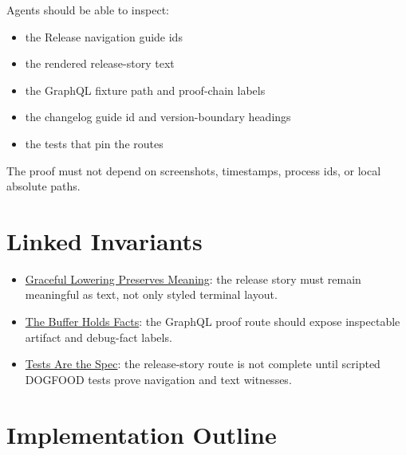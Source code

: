 Agents should be able to inspect:

\begin{itemize}
\tightlist
\item
  the Release navigation guide ids
\item
  the rendered release-story text
\item
  the GraphQL fixture path and proof-chain labels
\item
  the changelog guide id and version-boundary headings
\item
  the tests that pin the routes
\end{itemize}

The proof must not depend on screenshots, timestamps, process ids, or local absolute paths.

\section{Linked Invariants}\label{record-118-linked-invariants}

\begin{itemize}
\tightlist
\item
  \href{https://github.com/flyingrobots/bijou/blob/cbd70612140e7a450d764b3c7be1c6af878b99bc/docs/invariants/graceful-lowering-preserves-meaning.md}{Graceful Lowering Preserves Meaning}: the release story must remain meaningful as text, not only styled terminal layout.
\item
  \href{https://github.com/flyingrobots/bijou/blob/cbd70612140e7a450d764b3c7be1c6af878b99bc/docs/invariants/buffer-holds-facts.md}{The Buffer Holds Facts}: the GraphQL proof route should expose inspectable artifact and debug-fact labels.
\item
  \href{https://github.com/flyingrobots/bijou/blob/cbd70612140e7a450d764b3c7be1c6af878b99bc/docs/invariants/tests-are-the-spec.md}{Tests Are the Spec}: the release-story route is not complete until scripted DOGFOOD tests prove navigation and text witnesses.
\end{itemize}

\section{Implementation Outline}\label{record-118-implementation-outline}

